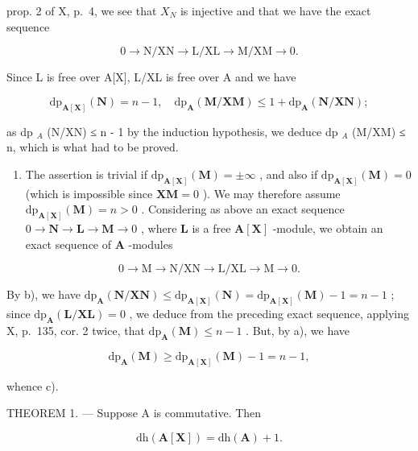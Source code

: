 prop. 2 of X, p.~4, we see that \(X_{N}\) is injective and that we have the exact sequence

\[
0 \rightarrow \mathrm{N} / \mathrm{XN} \rightarrow \mathrm{L} / \mathrm{XL} \rightarrow \mathrm{M} / \mathrm{XM} \rightarrow 0.
\]

Since L is free over A{[}X{]}, L/XL is free over A and we have

\[
\mathrm{dp} _ {\mathbf {A} [ \mathbf {X} ]} (\mathbf {N}) = n - 1, \quad \mathrm{dp} _ {\mathbf {A}} (\mathbf {M} / \mathbf {X M}) \leqslant 1 + \mathrm{dp} _ {\mathbf {A}} (\mathbf {N} / \mathbf {X N});
\]

as dp \(_{A}\) (N/XN) ≤ n - 1 by the induction hypothesis, we deduce dp \(_{A}\) (M/XM) ≤ n, which is what had to be proved.

\begin{enumerate}
\def\labelenumi{\alph{enumi})}
\setcounter{enumi}{2}
\tightlist
\item
  The assertion is trivial if \(\mathrm{dp}_{\mathbf{A}[\mathbf{X}]}(\mathbf{M}) = \pm \infty\) , and also if \(\mathrm{dp}_{\mathbf{A}[\mathbf{X}]}(\mathbf{M}) = 0\) (which is impossible since \(\mathbf{XM} = 0\) ). We may therefore assume \(\mathrm{dp}_{\mathbf{A}[\mathbf{X}]}(\mathbf{M}) = n > 0\) . Considering as above an exact sequence \(0 \to \mathbf{N} \to \mathbf{L} \to \mathbf{M} \to 0\) , where \(\mathbf{L}\) is a free \(\mathbf{A}[\mathbf{X}]\) -module, we obtain an exact sequence of \(\mathbf{A}\) -modules
\end{enumerate}

\[
0 \rightarrow \mathrm{M} \rightarrow \mathrm{N} / \mathrm{XN} \rightarrow \mathrm{L} / \mathrm{XL} \rightarrow \mathrm{M} \rightarrow 0.
\]

By b), we have \(\mathrm{dp}_{\mathbf{A}}(\mathbf{N} / \mathbf{X}\mathbf{N}) \leqslant \mathrm{dp}_{\mathbf{A}[\mathbf{X}]}(\mathbf{N}) = \mathrm{dp}_{\mathbf{A}[\mathbf{X}]}(\mathbf{M}) - 1 = n - 1\) ; since \(\mathrm{dp}_{\mathbf{A}}(\mathbf{L} / \mathbf{XL}) = 0\) , we deduce from the preceding exact sequence, applying X, p.~135, cor. 2 twice, that \(\mathrm{dp}_{\mathbf{A}}(\mathbf{M}) \leqslant n - 1\) . But, by a), we have

\[
\mathrm{dp} _ {\mathbf {A}} (\mathbf {M}) \geqslant \mathrm{dp} _ {\mathbf {A} [ \mathbf {X} ]} (\mathbf {M}) - 1 = n - 1,
\]

whence c).

THEOREM 1. --- Suppose A is commutative. Then

\[
\mathrm{dh} (\mathbf {A} [ \mathbf {X} ]) = \mathrm{dh} (\mathbf {A}) + 1.
\]

